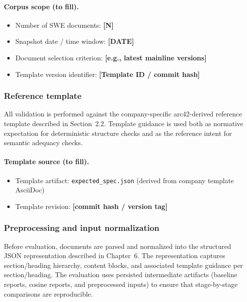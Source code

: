 \paragraph{Corpus scope (to fill).}
\begin{itemize}
    \item Number of SWE documents: \textbf{[N]}
    \item Snapshot date / time window: \textbf{[DATE]}
    \item Document selection criterion: \textbf{[e.g., latest mainline versions]}
    \item Template version identifier: \textbf{[Template ID / commit hash]}
\end{itemize}

\subsubsection{Reference template}
\label{sec:eval_template}

All validation is performed against the company-specific arc42-derived reference template described in Section~2.2. Template guidance is used both as normative expectation for deterministic structure checks and as the reference intent for semantic adequacy checks.

\paragraph{Template source (to fill).}
\begin{itemize}
    \item Template artifact: \texttt{expected\_spec.json} (derived from company template AsciiDoc)
    \item Template revision: \textbf{[commit hash / version tag]}
\end{itemize}

\subsubsection{Preprocessing and input normalization}
\label{sec:eval_preprocessing}

Before evaluation, documents are parsed and normalized into the structured JSON representation described in Chapter~6. The representation captures section/heading hierarchy, content blocks, and associated template guidance per section/heading. The evaluation uses persisted intermediate artifacts (baseline reports, cosine reports, and preprocessed inputs) to ensure that stage-by-stage comparisons are reproducible.

